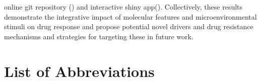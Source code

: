 \documentclass[11pt, a4paper, twosided]{book}
\begin{document}
online git repository () and interactive shiny app(). Collectively, these results demonstrate the integrative impact of molecular features and microenvironmental stimuli on drug response and propose potential novel drivers and drug resistance mechanisms and strategies for targeting these in future work.
\newpage\null\newpage

\newpage
\tableofcontents
\clearpage

\newpage
\hypertarget{list-of-abbreviations}{%
\chapter*{List of Abbreviations}\label{list-of-abbreviations}}
\end{document}
